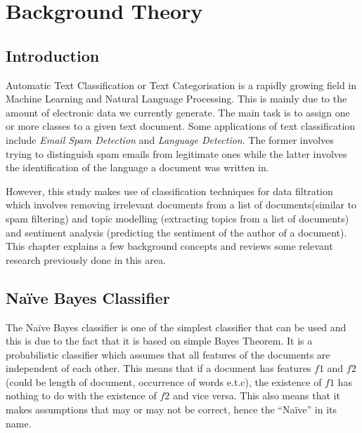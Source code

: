 
\chapter{Background Theory}

\label{ch:background}

\section{Introduction}
\label{sec:background-introduction}

Automatic Text Classification or Text Categorisation is a rapidly growing field in Machine Learning
and Natural Language Processing. This is mainly due to the amount of electronic data we currently
generate. The main task is to assign one or more classes to a given text document. Some applications
of text classification include \textit{Email Spam Detection} and \textit{Language Detection}. The
former involves trying to distinguish spam emails from legitimate ones while the latter involves the
identification of the language a document was written in.

However, this study makes use of classification techniques for data filtration which involves
removing irrelevant documents from a list of documents(similar to spam filtering) and topic
modelling (extracting topics from a list of documents) and sentiment analysis (predicting the
sentiment of the author of a document). This chapter explains a few background concepts and reviews
some relevant research previously done in this area.

\section{Na\"{i}ve Bayes Classifier}
\label{sec:bg-naive-bayes}
The Na\"{i}ve Bayes classifier is one of the simplest classifier that can be used and this is due to
the fact that it is based on simple Bayes Theorem. It is a probabilistic classifier which assumes
that all features of the documents are independent of each other. This means that if a document has
features $f1$ and $f2$ (could be length of document, occurrence of words e.t.c), the
existence of $f1$ has nothing to do with the existence of $f2$ and vice versa. This also means that
it makes assumptions that may or may not be correct, hence the ``Na\"{i}ve'' in its name.

